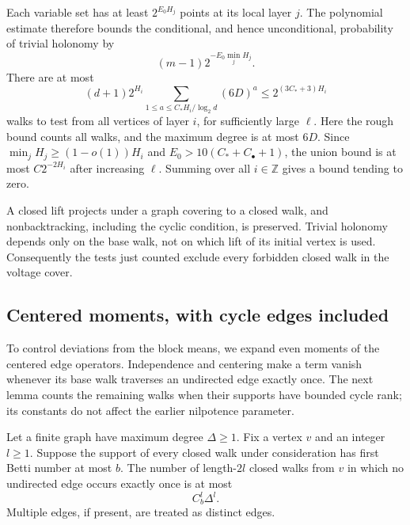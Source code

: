 Each variable set has at least \(2^{E_0H_j}\) points at its local
layer \(j\).  The polynomial estimate therefore bounds the
conditional, and hence unconditional, probability of trivial
holonomy by
\[
 (m-1)2^{-E_0\min_j H_j}.
\]
There are at most
\[
 (d+1)2^{H_i}
 \sum_{1\le a\le C_*H_i/\log_2d}(6D)^a
 \le 2^{(3C_*+3)H_i}
\]
walks to test from all vertices of layer \(i\), for sufficiently
large \(\ell\).  Here the rough bound counts all walks, and the
maximum degree is at most \(6D\).  Since
\(\min_jH_j\ge(1-o(1))H_i\) and
\(E_0>10(C_*+C_\bullet+1)\), the union bound is at most
\(C2^{-2H_i}\) after increasing \(\ell\).  Summing over all
\(i\in\mathbb Z\) gives a bound tending to zero.

A closed lift projects under a graph covering to a closed walk,
and nonbacktracking, including the cyclic condition, is preserved.
Trivial holonomy depends only on the base walk, not on which lift
of its initial vertex is used.  Consequently the tests just counted
exclude every forbidden closed walk in the voltage cover.

\subsection{Centered moments, with cycle edges included}

To control deviations from the block means, we expand even moments
of the centered edge operators. Independence and centering make a
term vanish whenever its base walk traverses an undirected edge
exactly once. The next lemma counts the remaining walks when their
supports have bounded cycle rank; its constants do not affect the
earlier nilpotence parameter.

\begin{lemma}\label{sam:walk-count}
Let a finite graph have maximum degree \(\Delta\ge1\).  Fix a
vertex \(v\) and an integer \(l\ge1\).  Suppose the support of
every closed walk under consideration has first Betti number at
most \(b\).  The number of length-\(2l\) closed walks from \(v\)
in which no undirected edge occurs exactly once is at most
\[
 C_b^l\Delta^l.
\]
Multiple edges, if present, are treated as distinct edges.
\end{lemma}


